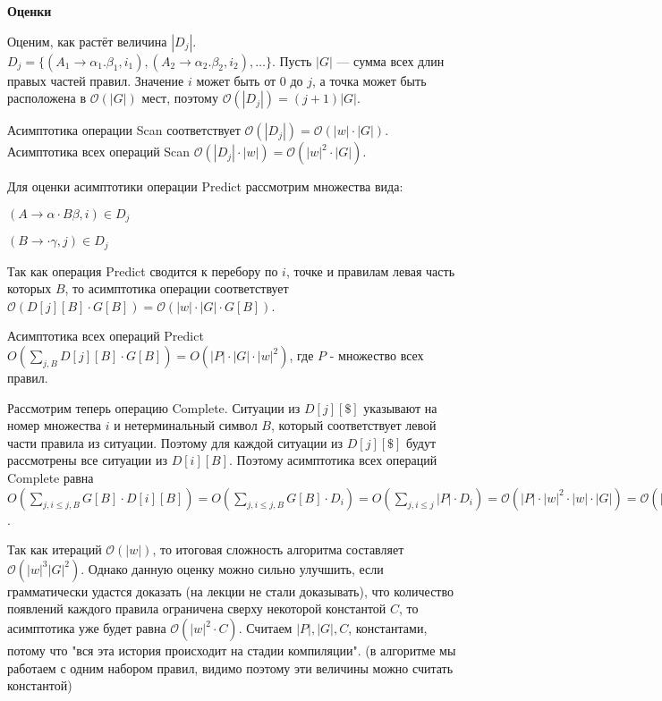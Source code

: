 \textbf{Оценки}

Оценим, как растёт величина $|D_j|$. $D_j = \{(A_1 \rightarrow \alpha_1 . \beta_1, i_1), (A_2 \rightarrow \alpha_2 . \beta_2, i_2), \dots \}$. Пусть $|G|$ — сумма всех длин правых частей правил. Значение $i$ может быть от $0$ до $j$, а точка может быть расположена в $\mathcal{O} (|G|)$ мест, поэтому $\mathcal{O} (|D_j|) = (j + 1)|G|$. 

Асимптотика операции Scan соответствует $\mathcal{O} (|D_j|) = \mathcal{O} (|w| \cdot |G|)$.\\
Асимптотика всех операций Scan $\mathcal{O} (|D_j| \cdot |w|) = \mathcal{O} (|w|^2 \cdot |G|)$.

Для оценки асимптотики операции Predict рассмотрим множества вида:

\begin{center}
    $(A \rightarrow \alpha \cdot B \beta, i) \in D_j$
    
    $(B \rightarrow \cdot \gamma, j) \in D_j$
\end{center}

Так как операция Predict сводится к перебору по $i$, точке и правилам левая часть которых $B$, то асимптотика операции соответствует $\mathcal{O} (D[j][B] \cdot G[B]) = \mathcal{O} (|w| \cdot |G| \cdot G[B])$.

Асимптотика всех операций Predict $O( \sum_{j, B} D[j][B] \cdot G[B] ) = O( |P| \cdot |G| \cdot |w|^2 )$, где $P$ - множество всех правил. 

Рассмотрим теперь операцию Complete. Ситуации из $D[j][\$]$ указывают на номер множества $i$ и нетерминальный символ $B$, который соответствует левой части правила из ситуации. Поэтому для каждой ситуации из $D[j][\$]$ будут рассмотрены все ситуации из $D[i][B]$. Поэтому асимптотика всех операций Complete равна $O(\sum_{j, i \leq j, B} G[B] \cdot D[i][B]) = O(\sum_{j, i \leq j, B} G[B] \cdot D_i) = O(\sum_{j, i \leq j} |P| \cdot D_i) = \mathcal{O} (|P| \cdot |w|^2 \cdot |w| \cdot |G|) = \mathcal{O} ({|w|}^3 {|G|}^2)$.

Так как итераций $\mathcal{O} (|w|)$, то итоговая сложность алгоритма составляет $\mathcal{O} ({|w|}^3{|G|}^2)$. Однако данную оценку можно сильно улучшить, если грамматически удастся доказать (на лекции не стали доказывать), что количество появлений каждого правила ограничена сверху некоторой константой $C$, то асимптотика уже будет равна $\mathcal{O} ({|w|}^2 \cdot C)$. Считаем $|P|, |G|, C$, константами, потому что "вся эта история происходит на стадии компиляции". (в алгоритме мы работаем с одним набором правил, видимо поэтому эти величины можно считать константой)

